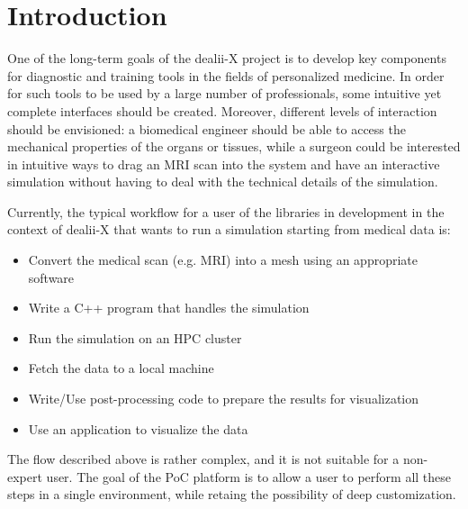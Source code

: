 \documentclass[a4paper,12pt]{article}
\begin{document}
\vspace*{2cm}

\disclaimer

\newpage

\tableofcontents %

\newpage


\section{\textcolor{EUblue}{Introduction}}

One of the long-term goals of the dealii-X project is to develop key components for diagnostic and training tools in the fields of personalized medicine. In order for such tools to be used by a large number of professionals, some intuitive yet complete interfaces should be created. Moreover, different levels of interaction should be envisioned: a biomedical engineer should be able to access the mechanical properties of the organs or tissues, while a surgeon could be interested in intuitive ways to drag an MRI scan into the system and have an interactive simulation without having to deal with the technical details of the simulation.

Currently, the typical workflow for a user of the libraries in development in the context of dealii-X that wants to run a simulation starting from medical data is:
\begin{itemize}
    \item Convert the medical scan (e.g. MRI) into a mesh using an appropriate software  
    \item Write a C++ program that handles the simulation
    \item Run the simulation on an HPC cluster
    \item Fetch the data to a local machine
    \item Write/Use post-processing code to prepare the results for visualization
    \item Use an application to visualize the data
\end{itemize} 
The flow described above is rather complex, and it is not suitable for a non-expert user. The goal of the PoC platform is to allow a user to perform all these steps in a single environment, while retaing the possibility of deep customization.
\end{document}
